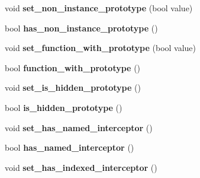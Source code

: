 \begin{DoxyCompactItemize}
\item 
\hypertarget{classv8_1_1internal_1_1_map_a0bf42a0d653fda55aedb301861ceb869}{}void {\bfseries set\+\_\+non\+\_\+instance\+\_\+prototype} (bool value)\label{classv8_1_1internal_1_1_map_a0bf42a0d653fda55aedb301861ceb869}

\item 
\hypertarget{classv8_1_1internal_1_1_map_aa5ba1ea3cd9833c8f52f9e477338f4ba}{}bool {\bfseries has\+\_\+non\+\_\+instance\+\_\+prototype} ()\label{classv8_1_1internal_1_1_map_aa5ba1ea3cd9833c8f52f9e477338f4ba}

\item 
\hypertarget{classv8_1_1internal_1_1_map_a381b609e7465583476330e7edaa3f724}{}void {\bfseries set\+\_\+function\+\_\+with\+\_\+prototype} (bool value)\label{classv8_1_1internal_1_1_map_a381b609e7465583476330e7edaa3f724}

\item 
\hypertarget{classv8_1_1internal_1_1_map_ad547061a6e6144da8b57e4deb1f358de}{}bool {\bfseries function\+\_\+with\+\_\+prototype} ()\label{classv8_1_1internal_1_1_map_ad547061a6e6144da8b57e4deb1f358de}

\item 
\hypertarget{classv8_1_1internal_1_1_map_a2427eabb5ac583420da71b4c981c557d}{}void {\bfseries set\+\_\+is\+\_\+hidden\+\_\+prototype} ()\label{classv8_1_1internal_1_1_map_a2427eabb5ac583420da71b4c981c557d}

\item 
\hypertarget{classv8_1_1internal_1_1_map_a4a75abefb155e74ce641ba49a1bc2610}{}bool {\bfseries is\+\_\+hidden\+\_\+prototype} ()\label{classv8_1_1internal_1_1_map_a4a75abefb155e74ce641ba49a1bc2610}

\item 
\hypertarget{classv8_1_1internal_1_1_map_a9645e689ef1fb654bb7e4ad8cc993b83}{}void {\bfseries set\+\_\+has\+\_\+named\+\_\+interceptor} ()\label{classv8_1_1internal_1_1_map_a9645e689ef1fb654bb7e4ad8cc993b83}

\item 
\hypertarget{classv8_1_1internal_1_1_map_a4475b2c44b9e4cdb315f3118264daa2f}{}bool {\bfseries has\+\_\+named\+\_\+interceptor} ()\label{classv8_1_1internal_1_1_map_a4475b2c44b9e4cdb315f3118264daa2f}

\item 
\hypertarget{classv8_1_1internal_1_1_map_aec70bb5bd2f3f0866d962970acb66f87}{}void {\bfseries set\+\_\+has\+\_\+indexed\+\_\+interceptor} ()\label{classv8_1_1internal_1_1_map_aec70bb5bd2f3f0866d962970acb66f87}


\end{DoxyCompactItemize}
